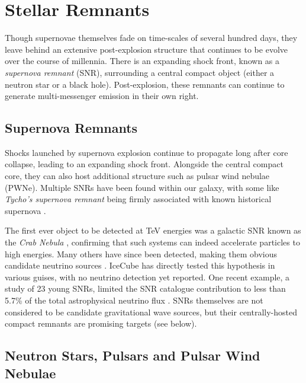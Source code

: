 \section{Stellar Remnants}

Though supernovae themselves fade on time-scales of several hundred days, they leave behind an extensive post-explosion structure that continues to be evolve over the course of millennia. There is an expanding shock front, known as a \emph{supernova remnant} (SNR), surrounding a central compact object (either a neutron star or a black hole). Post-explosion, these remnants can continue to generate multi-messenger emission in their own right.

\subsection*{Supernova Remnants}

Shocks launched by supernova explosion continue to propagate long after core collapse, leading to an expanding shock front. Alongside the central compact core, they can also host additional structure such as pulsar wind nebulae (PWNe). Multiple SNRs have been found within our galaxy, with some like \emph{Tycho's supernova remnant} being firmly associated with known historical supernova .

The first ever object to be detected at TeV energies was a galactic SNR known as the \emph{Crab Nebula} , confirming that such systems can indeed accelerate particles to high energies. Many others have since been detected, making them obvious candidate neutrino sources . IceCube has directly tested this hypothesis in various guises, with no neutrino detection yet reported. One recent example, a study of 23 young SNRs, limited the SNR catalogue contribution to less than 5.7\% of the total astrophysical neutrino flux \cite{ic_17_galactic}. SNRs themselves are not considered to be candidate gravitational wave sources, but their centrally-hosted compact remnants are promising targets (see below).

\subsection*{Neutron Stars, Pulsars and Pulsar Wind Nebulae}

